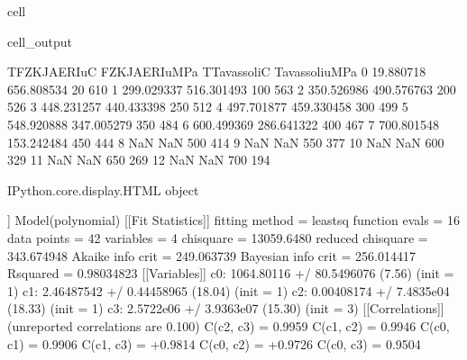 \documentclass[letterpaper,10pt,english]{jupyterBook}
\begin{document}
\begin{sphinxuseclass}{cell}
\begin{sphinxVerbatimOutput}
\begin{sphinxuseclass}{cell_output}
\begin{sphinxVerbatim}[commandchars=\\\{\}]
					T\PYGZus{}FZK\PYGZus{}JAERI\PYGZus{}uC  FZK\PYGZus{}JAERI\PYGZus{}uMPa  T\PYGZus{}TavassoliC  Tavassoli\PYGZus{}uMPa  
					0        19.880718      656.808534            20             610  
					1       299.029337      516.301493           100             563  
					2       350.526986      490.576763           200             526  
					3       448.231257      440.433398           250             512  
					4       497.701877      459.330458           300             499  
					5       548.920888      347.005279           350             484  
					6       600.499369      286.641322           400             467  
					7       700.801548      153.242484           450             444  
					8              NaN             NaN           500             414  
					9              NaN             NaN           550             377  
					10             NaN             NaN           600             329  
					11             NaN             NaN           650             269  
					12             NaN             NaN           700             194  
				\end{sphinxVerbatim}
				
				\begin{sphinxVerbatim}[commandchars=\\\{\}]
					\PYGZlt{}IPython.core.display.HTML object\PYGZgt{}
				\end{sphinxVerbatim}
				
				\sphinxAtStartPar
				
				\begin{sphinxVerbatim}[commandchars=\\\{\}]
					[[Model]]
					Model(polynomial)
					[[Fit Statistics]]
					\PYGZsh{} fitting method   = leastsq
					\PYGZsh{} function evals   = 16
					\PYGZsh{} data points      = 42
					\PYGZsh{} variables        = 4
					chi\PYGZhy{}square         = 13059.6480
					reduced chi\PYGZhy{}square = 343.674948
					Akaike info crit   = 249.063739
					Bayesian info crit = 256.014417
					R\PYGZhy{}squared          = 0.98034823
					[[Variables]]
					c0:  1064.80116 +/\PYGZhy{} 80.5496076 (7.56\PYGZpc{}) (init = 1)
					c1: \PYGZhy{}2.46487542 +/\PYGZhy{} 0.44458965 (18.04\PYGZpc{}) (init = 1)
					c2:  0.00408174 +/\PYGZhy{} 7.4835e\PYGZhy{}04 (18.33\PYGZpc{}) (init = 1)
					c3: \PYGZhy{}2.5722e\PYGZhy{}06 +/\PYGZhy{} 3.9363e\PYGZhy{}07 (15.30\PYGZpc{}) (init = 3)
					[[Correlations]] (unreported correlations are \PYGZlt{} 0.100)
					C(c2, c3) = \PYGZhy{}0.9959
					C(c1, c2) = \PYGZhy{}0.9946
					C(c0, c1) = \PYGZhy{}0.9906
					C(c1, c3) = +0.9814
					C(c0, c2) = +0.9726
					C(c0, c3) = \PYGZhy{}0.9504
				\end{sphinxVerbatim}
				

\end{sphinxuseclass}
\end{sphinxVerbatimOutput}
\end{sphinxuseclass}
\end{document}
